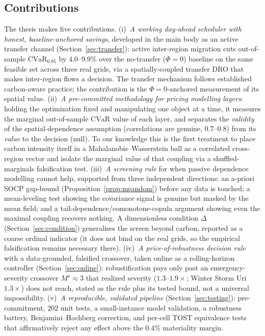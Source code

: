 \documentclass[12pt]{article}
\newcommand{\CVaR}{\mathrm{CVaR}}
\begin{document}
\subsection{Contributions}
The thesis makes five contributions. (i)~\emph{A working day-ahead scheduler with
honest, baseline-anchored savings}, developed in the main body as an active transfer
channel (Section~\ref{sec:transfer}): active inter-region migration cuts out-of-sample
$\CVaR_{0.95}$ by $4.0$--$9.9\%$ over the no-transfer ($\Phi=0$) baseline on the same
feasible set across three real grids, via a spatially-coupled transfer DRO that makes
inter-region flows a decision. The transfer mechanism follows established carbon-aware
practice; the contribution is the $\Phi=0$-anchored measurement of its spatial value.
(ii)~\emph{A pre-committed methodology for pricing modelling layers}: holding the
optimization fixed and manipulating one object at a time, it measures the marginal
out-of-sample $\CVaR$ value of each layer, and separates the \emph{validity} of the
spatial-dependence assumption (correlations are genuine, $0.7$--$0.8$) from its
\emph{value} to the decision (null). To our knowledge this is the first treatment to
place carbon intensity itself in a Mahalanobis--Wasserstein ball as a correlated
cross-region vector and isolate the marginal value of that coupling via a
shuffled-marginals falsification test. (iii)~\emph{A screening rule} for when passive
dependence modelling cannot help, supported from three independent directions: an
a-priori SOCP gap-bound (Proposition~\ref{prop:meandom}) before any data is touched; a
mean-leveling test showing the covariance signal is genuine but masked by the mean field;
and a tail-dependence/comonotone-copula argument showing even the maximal coupling
recovers nothing. A dimensionless condition $\Delta$ (Section~\ref{sec:condition})
generalises the screen beyond carbon, reported as a coarse ordinal indicator (it does
not bind on the real grids, so the empirical falsification remains necessary there).
(iv)~\emph{A price-of-robustness decision rule} with a data-grounded, falsified
crossover, taken online as a rolling-horizon controller (Section~\ref{sec:online}):
robustification pays only past an emergency-severity crossover $M^\star\approx3$ that
realized severity ($1.3$--$1.9\times$; Winter Storm Uri $1.3\times$) does not reach,
stated as the rule plus its tested bound, not a universal impossibility. (v)~\emph{A
reproducible, validated pipeline} (Section~\ref{sec:testing}): pre-commitment, $202$
unit tests, a small-instance model validation, a robustness battery,
Benjamini--Hochberg correction, and per-cell TOST equivalence tests that affirmatively
reject any effect above the $0.4\%$ materiality margin.
\end{document}
